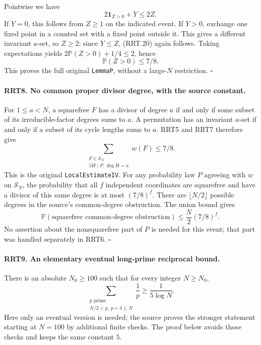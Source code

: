 Pointwise we have
\[
                 2\mathbf1_{Z>0}+Y\le2Z.
 \tag{RRT.20}
\]
If $Y=0$, this follows from $Z\ge1$ on the indicated event.
If $Y>0$, exchange one fixed point in a counted set with a fixed
point outside it.  This gives a different invariant $a$-set,
so $Z\ge2$; since $Y\le Z$, (RRT.20) again follows.
Taking expectations yields
$2\mathbb P(Z>0)+1/4\le2$, hence
\[
                       \mathbb P(Z>0)\le7/8.
 \tag{RRT.21}
\]
This proves the full original \texttt{LemmaP}, without a
large-$N$ restriction.
\hfill$\square$

\paragraph{RRT8. No common proper divisor degree, with the source constant.}
\label{claim:RRT8}
For $1\le a<N$, a squarefree $F$ has a divisor of degree $a$
if and only if some subset of its irreducible-factor degrees
sums to $a$.  A permutation has an invariant $a$-set if and
only if a subset of its cycle lengths sums to $a$.
RRT5 and RRT7 therefore give
\[
           \sum_{\substack{F\in\mathcal S_N\\
                      \exists H\mid F:\deg H=a}}w(F)\le7/8.
 \tag{RRT.22}
\]
This is the original \texttt{LocalEstimateIV}.  For any
probability law $P$ agreeing with $w$ on $\mathcal S_N$, the
probability that all $f$ independent coordinates are squarefree
and have a divisor of this same degree is at most $(7/8)^f$.
There are $\lfloor N/2\rfloor$ possible degrees in the
source's common-degree obstruction.  The union bound gives
\[
   \mathbb P(\text{squarefree common-degree obstruction})
                          \le\frac N2(7/8)^f.
 \tag{RRT.23}
\]
No assertion about the nonsquarefree part of $P$ is needed for
this event; that part was handled separately in RRT6.
\hfill$\square$

\paragraph{RRT9. An elementary eventual long-prime reciprocal bound.}
\label{claim:RRT9}
There is an absolute $N_0\ge100$ such that for every integer
$N\ge N_0$,
\[
       \sum_{\substack{p\text{ prime}\\N/2<p,\ p+3\le N}}
                           \frac1p\ge\frac1{5\log N}.
 \tag{RRT.24}
\]
Here only an eventual version is needed; the source proves the
stronger statement starting at $N=100$ by additional finite
checks.  The proof below avoids those checks and keeps the same
constant $5$.

